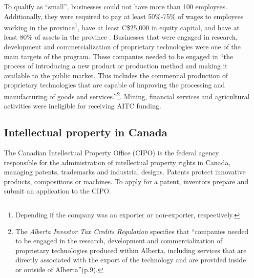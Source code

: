 \documentclass[../main.tex]{subfiles}
\begin{document}
To qualify as \enquote{small}, businesses could not have more than 100 employees. Additionally, they were required to pay at least 50\%-75\% of wages to employees working in the province\footnote{Depending if the company was an exporter or non-exporter, respectively.}, have at least C\$25,000 in equity capital, and have at least 80\% of assets in the province \parencite{albertaeconomicdevelopmentandtrade19}. Businesses that were engaged in research, development and commercialization of proprietary technologies were one of the main targets of the program. These companies needed to be engaged in \enquote{the process of introducing a new product or production method and making it available to the public market. This includes the commercial production of proprietary technologies that are capable of improving the processing and manufacturing of goods and services.}\parencite[19]{albertaeconomicdevelopmentandtrade19}\footnote{The \textit{Alberta Investor Tax Credits Regulation}\nocite{Alberta19a} specifies that \enquote{companies needed to be engaged in the research, development and commercialization of proprietary technologies produced within Alberta, including services that are directly associated with the export of the technology and are provided inside or outside of Alberta}(p.9).}. Mining, financial services and agricultural activities were ineligible for receiving AITC funding.

\subsection{Intellectual property in Canada}

The Canadian Intellectual Property Office (CIPO) is the federal agency responsible for the administration of intellectual property rights in Canada, managing patents, trademarks and industrial designs. Patents protect innovative products, compositions or machines. To apply for a patent, inventors prepare and submit an application to the CIPO. 
\end{document}
